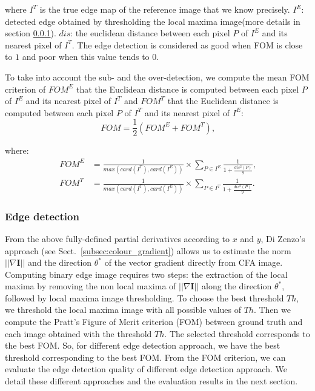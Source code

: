\documentclass[twoside]{article}
\begin{document}
\noindent where $I^T$ is the true edge map of the reference image that we know precisely.
$I^E$: detected edge obtained by thresholding the local maxima image(more details in section \ref{Edge detection}).
$dis$: the euclidean distance between each pixel $P$ of $I^E$ and  its nearest pixel of $I^T$.
The edge detection is considered as good when FOM is close to $1$ and poor when this value tends to $0$.

To take into account the sub- and the over-detection, we compute the mean FOM criterion of $FOM^E$ that the Euclidean distance is computed between each pixel $P$ of $I^E$ and its nearest pixel of $I^T$ and $FOM^T$ that the Euclidean distance is computed between each pixel $P$ of $I^T$ and its nearest pixel of $I^E$:
\begin{equation}
FOM = \frac{1}{2}(FOM^E+FOM^T) \text{,}
\end{equation}

\noindent where:
\begin{align}
FOM^E &= \frac{1}{max(card(I^T),card(I^E))} \times \sum_{P\in I^E}\frac{1}{1+\frac{dis^2(P)}{9}} \text{,} \\
FOM^T &= \frac{1}{max(card(I^T),card(I^E))} \times \sum_{P\in I^T}\frac{1}{1+\frac{dis^2(P)}{9}} \text{.}
\end{align}


\subsubsection{Edge detection}
\label{Edge detection}

From the above fully-defined partial derivatives according to $x$ and $y$, Di Zenzo's approach (see Sect.~\ref{subsec:colour_gradient}) allows us to estimate the norm $||\nabla \mathbf{I}||$ and the direction $\theta^{*}$ of the vector gradient directly from CFA image.
Computing binary edge image requires two steps: the extraction of the local maxima by removing the non local maxima of $||\nabla \mathbf{I}||$ along the direction $\theta^{*}$, followed by local maxima image thresholding.
To choose the best threshold $Th$, we threshold the local maxima image with all possible values of $Th$. Then we compute the Pratt's Figure of Merit criterion (FOM) between ground truth  and each image obtained with the threshold $Th$. The selected threshold corresponds to the best FOM. So, for different edge detection approach, we have the best threshold corresponding to the best FOM. From the FOM criterion, we can evaluate the edge detection quality of different edge detection approach. We detail these different approaches and the evaluation results in the next section. 
\end{document}
